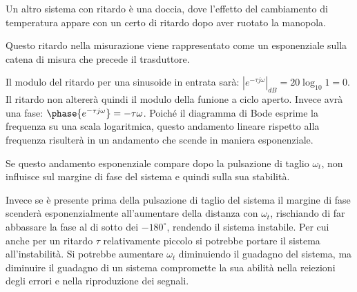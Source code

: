 \documentclass{article}
\numberwithin{equation}{subsection}
\begin{document}
Un altro sistema con ritardo è una doccia, dove l'effetto del cambiamento di temperatura appare con un certo di ritardo dopo aver ruotato la manopola. 

Questo ritardo nella misurazione viene rappresentato come un esponenziale sulla catena di misura che precede il trasduttore. 

\begin{center}\end{center}

Il modulo del ritardo per una sinusoide in entrata sarà: $|e^{-\tau j\omega}|_{dB}=20\log_{10}1=0$. Il ritardo non altererà quindi il modulo della funione a ciclo aperto.  
Invece avrà una fase: $\phase{e^{-\tau j\omega}}=-\tau\omega$. Poiché il diagramma di Bode esprime la frequenza su una scala logaritmica, questo andamento lineare rispetto alla 
frequenza risulterà in un andamento che scende in maniera esponenziale. 

Se questo andamento esponenziale compare dopo la pulsazione di taglio $\omega_t$, non influisce sul margine di fase del sistema e quindi sulla sua stabilità. 

Invece se è presente 
prima della pulsazione di taglio del sistema il margine di fase scenderà esponenzialmente all'aumentare della distanza con $\omega_t$, rischiando di far abbassare la fase al 
di sotto dei $-180^{\circ}$, rendendo il sistema instabile. Per cui anche per un ritardo $\tau$ relativamente piccolo si potrebbe portare il sistema all'instabilità. 
Si potrebbe aumentare $\omega_t$ diminuiendo il guadagno del sistema, ma diminuire il guadagno di un sistema compromette la sua abilità nella reiezioni degli errori e 
nella riproduzione dei segnali.  
\end{document}
